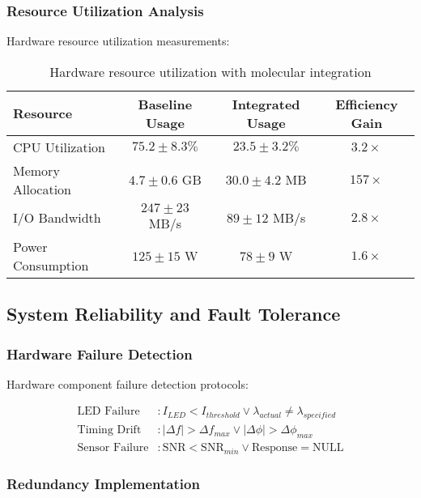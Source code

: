 \subsubsection{Resource Utilization Analysis}

Hardware resource utilization measurements:

\begin{table}[H]
\centering
\begin{tabular}{|l|c|c|c|}
\hline
\textbf{Resource} & \textbf{Baseline Usage} & \textbf{Integrated Usage} & \textbf{Efficiency Gain} \\
\hline
CPU Utilization & $75.2 \pm 8.3\%$ & $23.5 \pm 3.2\%$ & $3.2 \times$ \\
Memory Allocation & $4.7 \pm 0.6$ GB & $30.0 \pm 4.2$ MB & $157 \times$ \\
I/O Bandwidth & $247 \pm 23$ MB/s & $89 \pm 12$ MB/s & $2.8 \times$ \\
Power Consumption & $125 \pm 15$ W & $78 \pm 9$ W & $1.6 \times$ \\
\hline
\end{tabular}
\caption{Hardware resource utilization with molecular integration}
\end{table}

\subsection{System Reliability and Fault Tolerance}

\subsubsection{Hardware Failure Detection}

Hardware component failure detection protocols:

\begin{align}
\text{LED Failure} &: I_{LED} < I_{threshold} \lor \lambda_{actual} \neq \lambda_{specified} \\
\text{Timing Drift} &: |\Delta f| > \Delta f_{max} \lor |\Delta \phi| > \Delta \phi_{max} \\
\text{Sensor Failure} &: \text{SNR} < \text{SNR}_{min} \lor \text{Response} = \text{NULL}
\end{align}

\subsubsection{Redundancy Implementation}

